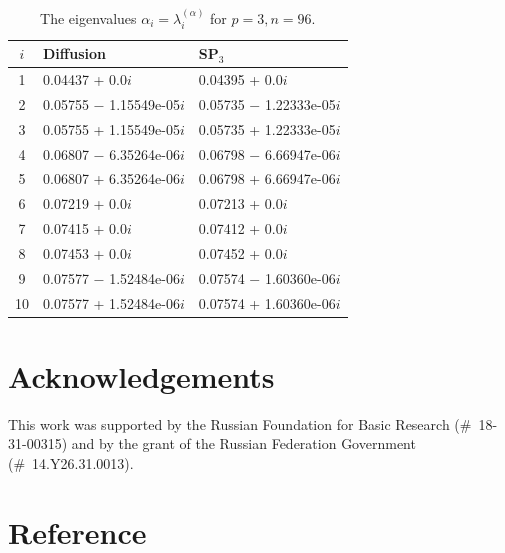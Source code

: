 \documentclass[authoryear]{elsarticle}
\begin{document}
\begin{table}[h]
\caption{The eigenvalues $\alpha_i=\lambda_i^{(\alpha)}$ for $p=3, n=96$.}
\label{tab:hwr_alpha_del_10}
\begin{center}
\begin{tabular}{c l l}
\hline
$i$ & Diffusion & SP$_3$ \\
\hline
1 &0.04437 + 0.0$i$     		&0.04395 + 0.0$i$ \\
2 &0.05755 $-$ 1.15549e-05$i$ 	&0.05735 $-$ 1.22333e-05$i$ \\
3 &0.05755 + 1.15549e-05$i$   	&0.05735 + 1.22333e-05$i$ \\
4 &0.06807 $-$ 6.35264e-06$i$   &0.06798 $-$ 6.66947e-06$i$ \\
5 &0.06807 + 6.35264e-06$i$     &0.06798 + 6.66947e-06$i$ \\
6 &0.07219 + 0.0$i$             &0.07213 + 0.0$i$ \\
7 &0.07415 + 0.0$i$             &0.07412 + 0.0$i$ \\
8 &0.07453 + 0.0$i$          	&0.07452 + 0.0$i$ \\
9 &0.07577 $-$ 1.52484e-06$i$   &0.07574 $-$ 1.60360e-06$i$ \\
10&0.07577 + 1.52484e-06$i$     &0.07574 + 1.60360e-06$i$ \\
\hline
\end{tabular}
\end{center}
\end{table}

\pagebreak
\newpage
\section*{Acknowledgements}

This work was supported by the Russian Foundation for Basic Research (\#~18-31-00315) 
and by the grant of the Russian Federation Government (\#~14.Y26.31.0013).

\section*{Reference}

\end{document}
